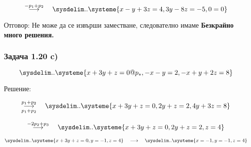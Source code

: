 \documentclass{subfiles}
\begin{document}
\begin{equation*}
    \overset{-p_{1} + p_{2}}{\longrightarrow}
    \quad
    \sysdelim..\systeme{
        x - y + 3z = 4,
        3y - 8z = -5,
        0 = 0
    }
\end{equation*}

\noindent Отговор: Не може да се извърши заместване, следователно имаме \textbf{Безкрайно много решения.}

\subsubsection{Задача 1.20 c)}

\begin{equation*}
    \sysdelim..\systeme{
        x + 3y + z = 0@p_{*},
        -x - y = 2,
        -x + y + 2z = 8
    }
\end{equation*}

\noindent Решение:

\begin{equation*}
    \overset{p_{1} + p_{2}}{\underset{p_{1} + p_{2}}{\longrightarrow}}
    \quad
    \sysdelim..\systeme{
        x + 3y + z = 0,
        2y + z = 2,
        4y + 3z = 8
    }
\end{equation*}

\begin{equation*}
    \overset{-2p_{2} + p_{3}}{\longrightarrow}
    \quad
    \sysdelim..\systeme{
        x + 3y + z = 0,
        2y + z = 2,
        z = 4
    }
\end{equation*}

\begin{equation*}
    \sysdelim..\systeme{
        x + 3y + z = 0,
        y = -1,
        z = 4
    }
    \quad
    \longrightarrow
    \quad
    \sysdelim..\systeme{
        x = -1,
        y = -1,
        z = 4
    }
\end{equation*}
\end{document}
